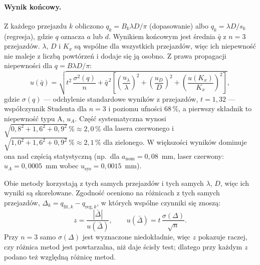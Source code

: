 \documentclass[12pt, a4paper]{article}
\begin{document}
\paragraph{Wynik końcowy.} Z każdego przejazdu $k$ obliczono $q_k = B_k\lambda D/\pi$
(dopasowanie) albo $q_k = \lambda D/s_k$ (regresja), gdzie $q$ oznacza $a$ lub $d$. Wynikiem
końcowym jest średnia $\bar q$ z $n = 3$ przejazdów. $\lambda$, $D$ i $K_x$ są wspólne dla wszystkich
przejazdów, więc ich niepewność nie maleje z liczbą powtórzeń i dodaje się ją osobno.
Z prawa propagacji niepewności dla $q = B\lambda D/\pi$:
\begin{equation}
    u(\bar q) = \sqrt{t^2\,\frac{\sigma^2(q)}{n}
              + \bar q^{\,2}\left[\left(\frac{u_\lambda}{\lambda}\right)^2
              + \left(\frac{u_D}{D}\right)^2 + \left(\frac{u(K_x)}{K_x}\right)^2\right]},
    \label{eq:u_final}
\end{equation}
gdzie $\sigma(q)$ --- odchylenie standardowe wyników z przejazdów, $t = 1{,}32$ ---
współczynnik Studenta dla $n = 3$ i poziomu ufności 68\,\%, a pierwszy składnik to
niepewność typu A, $u_A$. Część systematyczna wynosi
$\sqrt{0{,}8^2 + 1{,}6^2 + 0{,}9^2}\,\% \approx 2{,}0\,\%$ dla lasera czerwonego
i $\sqrt{1{,}0^2 + 1{,}6^2 + 0{,}9^2}\,\% \approx 2{,}1\,\%$ dla zielonego.
W większości wyników dominuje ona nad częścią statystyczną (np.\ dla $a_\text{nom} = 0{,}08$~mm,
laser czerwony: $u_A = 0{,}0005$~mm wobec $u_\text{sys} = 0{,}0015$~mm).

Obie metody korzystają z tych samych przejazdów i tych samych $\lambda$, $D$, więc ich wyniki
są skorelowane. Zgodność oceniono na różnicach z tych samych przejazdów,
$\Delta_k = q_{\text{fit},k} - q_{\text{reg},k}$, w których wspólne czynniki się znoszą:
\begin{equation}
    z = \frac{|\bar\Delta|}{u(\bar\Delta)}, \qquad u(\bar\Delta) = t\,\frac{\sigma(\Delta)}{\sqrt{n}}.
    \label{eq:z_methods}
\end{equation}
Przy $n = 3$ samo $\sigma(\Delta)$ jest wyznaczone niedokładnie, więc $z$ pokazuje raczej,
czy różnica metod jest powtarzalna, niż daje ścisły test; dlatego przy każdym $z$ podano
też względną różnicę metod.
\end{document}
